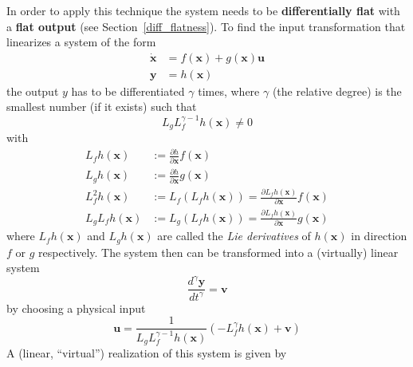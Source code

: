 In order to apply this technique the system needs to be \textbf{differentially flat} with a \textbf{flat output} (see Section~\ref{diff_flatness}).
\newpar{}
To find the input transformation that linearizes a system of the form
\begin{align*}
    \dot{\mathbf{x}} & = f(\mathbf{x}) + g(\mathbf{x}) \mathbf{u} \\
    \mathbf{y}       & = h(\mathbf{x})
\end{align*}
the output $y$ has to be differentiated $\gamma$ times, where $\gamma$ (the relative degree) is the smallest number (if it exists) such that
\begin{equation*}
    L_g L_f^{\gamma-1} h(\mathbf{x}) \ne 0
\end{equation*}
with
\begin{align*}
    L_f h(\mathbf{x})     & := \frac{\partial h}{\partial \mathbf{x}}f(\mathbf{x})                                           \\
    L_g h(\mathbf{x})     & := \frac{\partial h}{\partial \mathbf{x}}g(\mathbf{x})                                           \\
    L_f^2 h(\mathbf{x})   & := L_f(L_f h(\mathbf{x})) = \frac{\partial L_f h(\mathbf{x})}{\partial \mathbf{x}}f(\mathbf{x})  \\
    L_g L_f h(\mathbf{x}) & := L_g (L_f h(\mathbf{x})) = \frac{\partial L_f h(\mathbf{x})}{\partial \mathbf{x}}g(\mathbf{x})
\end{align*}
where $L_f h(\mathbf{x})$ and $L_g h(\mathbf{x})$ are called the \textit{Lie derivatives} of $h(\mathbf{x})$ in direction $f$ or $g$ respectively.
\newpar{}
The system then can be transformed into a (virtually) linear system
\begin{equation*}
    \frac{d^\gamma \mathbf{y}}{dt^\gamma} = \mathbf{v}
\end{equation*}
by choosing a physical input
\begin{equation*}
    \mathbf{u} = \frac{1}{L_g L_f^{\gamma-1} h(\mathbf{x})}(-L_f^\gamma h(\mathbf{x}) + \mathbf{v})
\end{equation*}
A (linear, ``virtual'') realization of this system is given by

